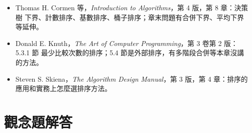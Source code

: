 \begin{itemize}
\item Thomas H. Cormen 等，\textit{Introduction to Algorithms}，第 4 版，第 8 章：決策樹
下界、計數排序、基數排序、桶子排序；章末問題有合併下界、平均下界等延伸。
\item Donald E. Knuth，\textit{The Art of Computer Programming}，第 3 卷第 2 版：5.3.1 節
最少比較次數的排序；5.4 節是外部排序，有多階段合併等本章沒講的方法。
\item Steven S. Skiena，\textit{The Algorithm Design Manual}，第 3 版，第 4 章：排序的
應用和實務上怎麼選排序方法。
\end{itemize}

\section*{觀念題解答}

